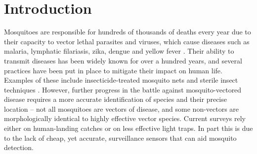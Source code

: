 \documentclass[10pt, twocolumn]{llncs}
\newcommand{\msn}[1]{\todo[color=gray!30]{[ms] #1}}
\begin{document}
\begin{abstract}
\end{abstract}

\section{Introduction}
Mosquitoes are responsible for hundreds of thousands of deaths every year due to their capacity to vector lethal parasites and viruses, which cause diseases such as malaria, lymphatic filariasis, zika, dengue and yellow fever \cite{WHO2016,WHO2014factsheet}. Their ability to transmit diseases has been widely known for over a hundred years, and several practices have been put in place to mitigate their impact on human life. Examples of these include insecticide-treated mosquito nets \cite{lengeler2004insecticide,bhatt2015} and sterile insect techniques \cite{alphey2010sterile}. However, further progress in the battle against mosquito-vectored disease requires a more accurate identification of  species and their precise location -- not all mosquitoes are vectors of disease, and some non-vectors are morphologically identical to highly effective vector species.
%
Current surveys rely either on human-landing catches or on less effective light traps. In part this is due to the lack of cheap, yet accurate, surveillance sensors that can aid mosquito detection.
\end{document}
